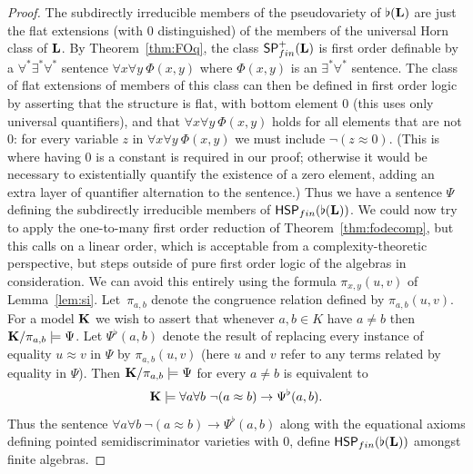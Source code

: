 \documentclass[10pt,a4paper]{amsart}
\begin{document}
\begin{proof}
The subdirectly irreducible members of the pseudovariety of $\flat({\bf L})$ are just the flat extensions (with $0$ distinguished) of the members of the universal Horn class of ${\bf L}$.  By Theorem~\ref{thm:FOq}, the class $\mathsf{SP}^+_{\rm fin}({\bf L})$ is first order definable by a $\forall^*\exists^*\forall^*$ sentence $\forall x\forall y\ \Phi(x,y)$ where $\Phi(x,y)$ is an $\exists^*\forall^*$ sentence.  The class of flat extensions of members of this class can then be defined in first order logic by asserting that the structure is flat, with bottom element $0$ (this uses only universal quantifiers), and that $\forall x\forall y\ \Phi(x,y)$ holds for all elements that are not $0$: for every variable $z$ in $\forall x\forall y\ \Phi(x,y)$ we must include $\neg(z\approx 0)$.  (This is where having $0$ is a constant is required in our proof; otherwise it would be necessary to existentially quantify the existence of a zero element, adding an extra layer of quantifier alternation to the sentence.)  Thus we have a sentence $\Psi$ defining the subdirectly irreducible members of
$\mathsf{HSP}_{\rm fin}(\flat({\bf L}))$.
We could now try to apply the one-to-many first order reduction of Theorem~\ref{thm:fodecomp}, but this calls on a linear order, which is acceptable from a complexity-theoretic perspective, but steps outside of pure first order logic of the algebras in consideration.  We can avoid this entirely using the formula $\pi_{x,y}(u,v)$ of Lemma~\ref{lem:si}.  
Let~$\pi_{a,b}$ denote the congruence relation defined by $\pi_{a,b}(u,v)$.  For a model ${\bf K}$ we wish to assert that whenever $a,b\in K$ have $a\neq b$ then ${\bf K}/\pi_{a,b}\models \Psi$.  
Let $\Psi^\flat(a,b)$ denote the result of replacing every instance of equality $u\approx v$ in $\Psi$ by $\pi_{a,b}(u,v)$ (here $u$ and $v$ refer to any terms related by equality in $\Psi$).  Then ${\bf K}/\pi_{a,b}\models \Psi$ for every $a\neq b$ is equivalent to 
\[
{\bf K}\models \forall a\forall b\ \neg(a\approx b)\rightarrow \Psi^\flat(a,b).
\]
Thus the sentence $\forall a\forall b\ \neg(a\approx b)\rightarrow \Psi^\flat(a,b)$ along with the equational axioms defining pointed semidiscriminator varieties with $0$, define $\mathsf{HSP}_{\rm fin}(\flat({\bf L}))$ amongst finite algebras.
\end{proof}
\end{document}

